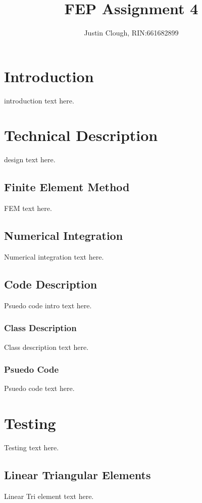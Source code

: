\documentclass[a4paper, 12pt]{article}
\author{Justin Clough, RIN:661682899}
\title{FEP Assignment 4}
\begin{document}
\maketitle

\section{Introduction} \label{sec:intro}
introduction text here.

\section{Technical Description} \label{sec:techDes}
design text here.

\subsection{Finite Element Method} \label{subsec:fem}
FEM text here.

\subsection{Numerical Integration} \label{subsec:numInt}
Numerical integration text here.

\subsection{Code Description} \label{subsec:codeDes}
Psuedo code intro text here.

\subsubsection{Class Description} \label{ssubsec:class}
Class description text here.

\subsubsection{Psuedo Code} \label{ssubsec:psuedo}
Psuedo code text here.

\section{Testing} \label{sec:testing}
Testing text here.

\subsection{Linear Triangular Elements} \label{subsec:linTri}
Linear Tri element text here.
\end{document}
